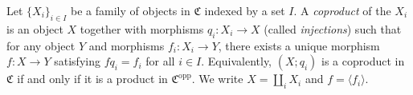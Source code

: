 Let $\{X_i\}_{i \in I}$ be a family of objects in $\mathfrak{C}$ indexed by a set $I$. A \textit{coproduct} of the $X_i$ is an object $X$ together with morphisms $q_i : X_i \to X$ (called \textit{injections}) such that for any object $Y$ and morphisms $f_i : X_i \to Y$, there exists a unique morphism $f : X \to Y$ satisfying $f q_i = f_i$ for all $i \in I$. Equivalently, $(X; q_i)$ is a coproduct in $\mathfrak{C}$ if and only if it is a product in $\mathfrak{C}^{\text{opp}}$. We write $X = \coprod_i X_i$ and $f = \langle f_i \rangle$.

